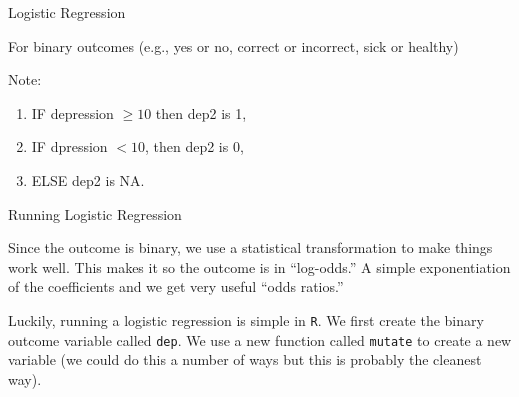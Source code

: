 \begin{frame}[fragile]{Logistic Regression}

For binary outcomes (e.g., yes or no, correct or incorrect, sick or
healthy)

\begin{Shaded}
\end{Shaded}

Note:

\begin{enumerate}
\def\labelenumi{\arabic{enumi}.}
\tightlist
\item
  IF depression \(\geq 10\) then dep2 is 1,
\item
  IF dpression \(< 10\), then dep2 is 0,
\item
  ELSE dep2 is NA.
\end{enumerate}

\end{frame}

\begin{frame}[fragile]{Running Logistic Regression}

Since the outcome is binary, we use a statistical transformation to make
things work well. This makes it so the outcome is in ``log-odds.'' A
simple exponentiation of the coefficients and we get very useful ``odds
ratios.''

Luckily, running a logistic regression is simple in \texttt{R}. We first
create the binary outcome variable called \texttt{dep}. We use a new
function called \texttt{mutate} to create a new variable (we could do
this a number of ways but this is probably the cleanest way).

\end{frame}

